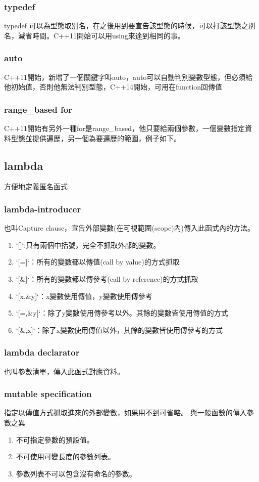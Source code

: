 \subsubsection{typedef}
typedef 可以為型態取別名，在之後用到要宣告該型態的時候，可以打該型態之別名，減省時間。C++11開始可以用using來達到相同的事。

\subsubsection{auto}
C++11開始，新增了一個關鍵字叫auto，auto可以自動判別變數型態，但必須給他初始值，否則他無法判別型態，C++14開始，可用在function回傳值

\subsubsection{range\_based for}
C++11開始有另外一種for是range\_based，他只要給兩個參數，一個變數指定資料型態並提供遍歷，另一個為要遍歷的範圍，例子如下。

\subsection{lambda}
方便地定義匿名函式
\subsubsection{lambda-introducer}
也叫Capture clause，宣告外部變數(在可視範圍(scope)內)傳入此函式內的方法。
\begin{enumerate}
\item `[]`:只有兩個中括號，完全不抓取外部的變數。
\item `[=]`：所有的變數都以傳值(call by value)的方式抓取
\item `[\&]`：所有的變數都以傳參考(call by reference)的方式抓取
\item `[x,\&y]`：x變數使用傳值，y變數使用傳參考
\item `[=,\&y]`：除了y變數使用傳參考以外。其餘的變數皆使用傳值的方式
\item `[\&,x]`：除了x變數使用傳值以外，其餘的變數皆使用傳參考的方式
\end{enumerate}
\subsubsection{lambda declarator}
也叫參數清單，傳入此函式對應資料。
\subsubsection{mutable specification}
指定以傳值方式抓取進來的外部變數，如果用不到可省略。
與一般函數的傳入參數之異
\begin{enumerate}
\item 不可指定參數的預設值。
\item 不可使用可變長度的參數列表。
\item 參數列表不可以包含沒有命名的參數。
\end{enumerate}
